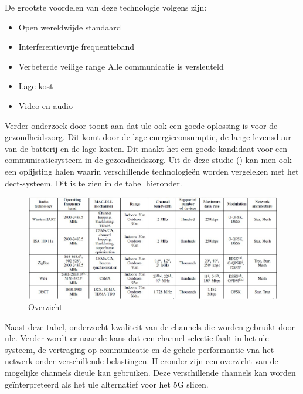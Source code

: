 De grootste voordelen van deze technologie volgens \textcite{GariniDil2014} zijn:

\begin{itemize}
  \item Open wereldwijde standaard
  \item Interferentievrije frequentieband
  \item Verbeterde veilige range
  \subitem Alle communicatie is versleuteld
  \item Lage kost
  \item Video en audio
\end{itemize}


Verder onderzoek door \textcite{Das2012} toont aan dat \gls{ule} ook een goede oplossing is voor de gezondheidszorg. Dit komt door de lage energieconsumptie, de lange levensduur van de batterij en de lage kosten. Dit maakt het een goede kandidaat voor een communicatiesysteem in de gezondheidszorg. Uit de deze studie (\textcite{Das2012}) kan men ook een oplijsting halen waarin verschillende technologieën worden vergeleken met het \gls{dect}-systeem. Dit is te zien in de tabel hieronder.

\begin{figure}[H]
  \includegraphics[width=\linewidth]{../graphics/overzicht.jpg}
  \caption{Overzicht \autocite[Door][Copyright 2012 van]{Das2012} \textcite{Das2012}}
  \label{fig:overzicht}
\end{figure}


Naast deze tabel, onderzocht \textcite{Das2012} kwaliteit van de channels die worden gebruikt door \gls{ule}. Verder wordt er naar de kans dat een channel selectie faalt in het \gls{ule}-systeem, de vertraging op communicatie en de gehele performantie vna het netwerk onder verschillende belastingen. Hieronder zijn een overzicht van de mogelijke channels die\gls{ule} kan gebruiken. Deze verschillende channels kan worden geïnterpreteerd als het \gls{ule} alternatief voor het 5G slicen.

